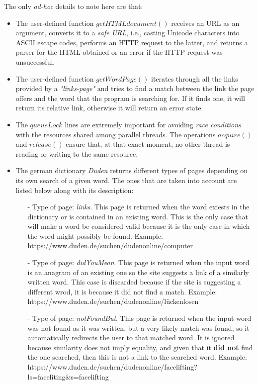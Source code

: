 \documentclass{article}
\begin{document}
The only \textit{ad-hoc} details to note here are that:
\begin{itemize}
	\item The user-defined function $getHTMLdocument()$ receives an URL as an argument, converts it to a \textit{safe URL}, i.e., casting Unicode characters into ASCII escape codes, performs an HTTP request to the latter, and returns a parser for the HTML obtained or an error if the HTTP request was unsuccessful.
	\item The user-defined function $getWordPage()$ iterates through all the links provided by a \textit{"links-page"} and tries to find a match between the link the page offers and the word that the program is searching for. If it finds one, it will return its relative link, otherwise it will return an error state.
	\item The $queueLock$ lines are extremely important for avoiding \textit{race conditions} with the resources shared among parallel threads. The operations $acquire()$ and $release()$ ensure that, at that exact moment, no other thread is reading or writing to the same resource.
	\item The german dictionary \textit{Duden} returns different types of pages depending on its own search of a given word. The ones that are taken into account are listed below along with its description:
	\begin{itemize}
		\item[-] Type of page: \textit{links}. This page is returned when the word exiests in the dictionary or is contained in an existing word. This is the only case that will make a word be considered valid because it is the only case in which the word might possibly be found. Example: https://www.duden.de/suchen/dudenonline/computer
		\item[-] Type of page: \textit{didYouMean}. This page is returned when the input word is an anagram of an existing one so the site suggests a link of a similarly written word. This case is discarded because if the site is suggesting a different wrod, it is because it did not find a match. Example: https://www.duden.de/suchen/dudenonline/lückenlosen
		\item[-] Type of page: \textit{notFoundBut}. This page is returned when the input word was not found as it was written, but a very likely match was found, so it automatically redirects the user to that matched word. It is ignored because similarity does not imply equality, and given that it \textbf{did not} find the one searched, then this is not a link to the searched word. Example: \\https://www.duden.de/suchen/dudenonline/facelifting?ls=faceliting\&s=facelifting

\end{itemize}
\end{itemize}
\end{document}

